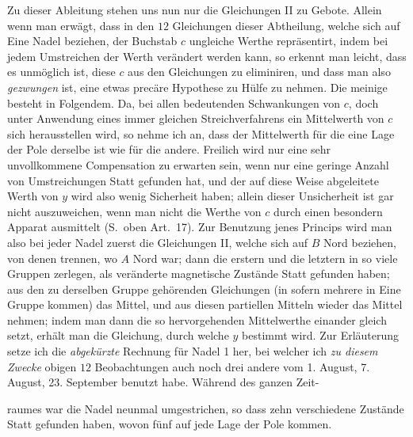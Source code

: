 Zu dieser Ableitung stehen uns nun nur die Gleichungen II zu Gebote. Allein wenn man erwägt, dass in den $12$ Gleichungen dieser Abtheilung, welche sich auf Eine Nadel beziehen, der Buchstab $c$ ungleiche Werthe repräsentirt, indem bei jedem Umstreichen der Werth verändert werden kann, so erkennt man leicht, dass es unmöglich ist, diese $c$ aus den Gleichungen zu eliminiren, und dass man also \textit{gezwungen} ist, eine etwas precäre Hypothese zu Hülfe zu nehmen. Die meinige besteht in Folgendem. Da, bei allen bedeutenden Schwankungen von $c$, doch unter Anwendung eines immer gleichen Streichverfahrens ein Mittelwerth von $c$ sich herausstellen wird, so nehme ich an, dass der Mittelwerth für die eine Lage der Pole derselbe ist wie für die andere. Freilich wird nur eine sehr unvollkommene Compensation zu erwarten sein, wenn nur eine geringe Anzahl von Umstreichungen Statt gefunden hat, und der auf diese Weise abgeleitete Werth von $y$ wird also wenig Sicherheit haben; allein dieser Unsicherheit ist gar nicht auszuweichen, wenn man nicht die Werthe von $c$ durch einen besondern Apparat ausmittelt (S.\ oben Art.\ 17). Zur Benutzung jenes Princips wird man also bei jeder Nadel zuerst die Gleichungen II, welche sich auf $B$ Nord beziehen, von denen trennen, wo $A$ Nord war; dann die erstern und die letztern in so viele Gruppen zerlegen, als veränderte magnetische Zustände Statt gefunden haben; aus den zu derselben Gruppe gehörenden Gleichungen (in sofern mehrere in Eine Gruppe kommen) das Mittel, und aus diesen partiellen Mitteln wieder das Mittel nehmen; indem man dann die so hervorgehenden Mittelwerthe einander gleich setzt, erhält man die Gleichung, durch welche $y$ bestimmt wird. Zur Erläuterung setze ich die \textit{abgekürzte} Rechnung für Nadel 1 her, bei welcher ich \textit{zu diesem Zwecke} obigen $12$ Beobachtungen auch noch drei andere vom 1. August, 7. August, 23. September benutzt habe. Während des ganzen Zeit-
\par\clearpage
{}
\noindent raumes war die Nadel neunmal umgestrichen, so dass zehn verschiedene Zustände Statt gefunden haben, wovon fünf auf jede Lage der Pole kommen.


